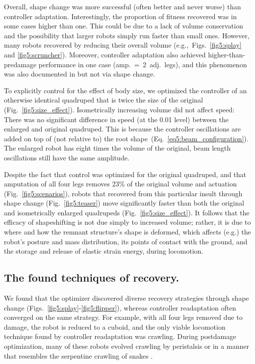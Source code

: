 Overall, shape change was more successful (often better and never worse) than controller adaptation.
Interestingly, the proportion of fitness recovered was in some cases higher than one.
This could be due to a lack of volume conservation and the possibility that larger robots simply run faster than small ones.
However, many robots recovered by reducing their overall volume (e.g.,~Figs.~\ref{fig5:splay} and \ref{fig5:scruncher}).
Moreover, controller adaptation also achieved higher-than-predamage performance in one case (amp.~=~2~adj.~legs), and this phenomenon was also documented in \cite{cully2015robots} but not via shape change.

To explicitly control for the effect of body size, we optimized the controller of an otherwise identical quadruped that is twice the size of the original (Fig.~\ref{fig5:size_effect}).
Isometrically increasing volume did not affect speed: There was no significant difference in speed (at the 0.01 level) between the enlarged and original quadruped. 
This is because the controller oscillations are added on top of (not relative to) the root shape~(Eq.~\ref{eq5:beam_configuration}).
The enlarged robot has eight times the volume of the original, beam length oscillations still have the same amplitude.





Despite the fact that control was optimized for the original quadruped, and that amputation of all four legs removes 23\% of the original volume and actuation (Fig.~\ref{fig5:scenarios}), robots that recovered from this particular insult through shape change (Fig.~\ref{fig5:teaser}) move significantly faster than both the original and isometrically enlarged quadrupeds (Fig.~\ref{fig5:size_effect}).
It follows that the efficacy of shapeshifting is not due simply to increased volume; rather, it is due to where and how the remnant structure's shape is deformed, which affects (e.g.) the robot's posture and mass distribution, its points of contact with the ground, and the storage and release of elastic strain energy, during locomotion.


\subsection*{The found techniques of recovery.}


We found that the optimizer discovered diverse recovery strategies through shape change (Figs.~\ref{fig5:splay}-\ref{fig5:flipper}), whereas controller readaptation often converged on the same strategy.
For example, with all four legs removed due to damage, the robot is reduced to a cuboid, and the only viable locomotion technique found by controller readaptation was crawling.
During postdamage optimization, many of these robots evolved crawling by peristalsis or in a manner that resembles the serpentine crawling of snakes \cite{alexander2003principles}.

